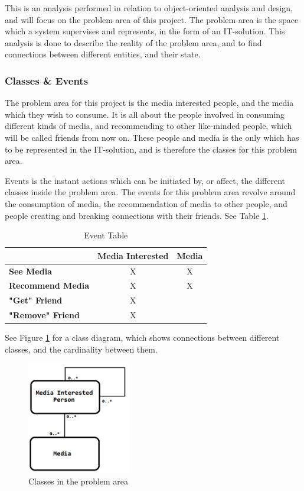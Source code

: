 This is an analysis performed in relation to object-oriented analysis and design, and will focus on the problem area of this project. The problem area is the space which a system supervises and represents, in the form of an IT-solution. This analysis is done to describe the reality of the problem area, and to find connections between different entities, and their state.

\subsubsection{Classes \& Events}

The problem area for this project is  the media interested people, and the media which they wish to consume. It is all about the people involved in consuming different kinds of media, and recommending to other like-minded people, which will be called friends from now on. These people and media is the only which has to be represented in the IT-solution, and is therefore the classes for this problem area.

Events is the instant actions which can be initiated by, or affect, the different classes inside the problem area. The events for this problem area revolve around the consumption of media, the recommendation of media to other people, and people creating and breaking connections with their friends. See Table \ref{EventTable}.

\begin{table}[htb]
\centering
\begin{tabular}{|l|c|c|} \hline
	  & \textbf{Media Interested} & \textbf{Media} \\ \hline
	\textbf{See Media} & X & X \\ \hline
	\textbf{Recommend Media} & X & X \\ \hline
	\textbf{"Get" Friend} & X &  \\ \hline
	\textbf{"Remove" Friend} & X &  \\ \hline
\end{tabular}
\caption{Event Table}
\label{EventTable}
\end{table}

See Figure \ref{ClassDiagram} for a class diagram, which shows connections between different classes, and the cardinality between them.

\begin{figure}[htb]
\centering
\includegraphics[width=0.4\textwidth]{Images/classdiagram.png}
\caption{Classes in the problem area}
\label{ClassDiagram}
\end{figure}

